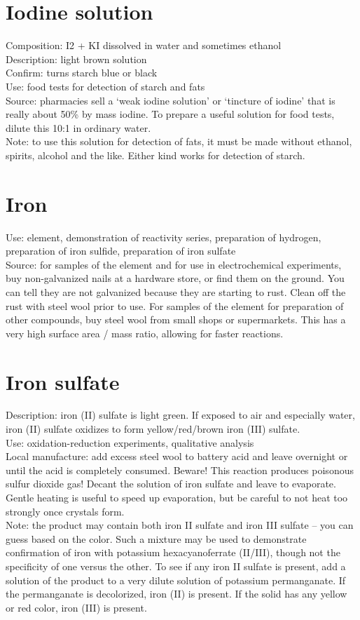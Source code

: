 \section{Iodine solution}
Composition: I2 + KI dissolved in water and sometimes ethanol\\
Description: light brown solution\\
Confirm: turns starch blue or black\\
Use: food tests for detection of starch and fats\\
Source: pharmacies sell a ‘weak iodine solution’ 
or ‘tincture of iodine’ that is really about 50\% by mass iodine. 
To prepare a useful solution for food tests, 
dilute this 10:1 in ordinary water.\\
Note: to use this solution for detection of fats, 
it must be made without ethanol, 
spirits, 
alcohol and the like. 
Either kind works for detection of starch.

\section{Iron}
Use: element, 
demonstration of reactivity series, 
preparation of hydrogen, 
preparation of iron sulfide, 
preparation of iron sulfate\\
Source: for samples of the element 
and for use in electrochemical experiments, 
buy non-galvanized nails at a hardware store, 
or find them on the ground. 
You can tell they are not galvanized because they are starting to rust. 
Clean off the rust with steel wool prior to use. 
For samples of the element for preparation of other compounds, 
buy steel wool from small shops or supermarkets. 
This has a very high surface area / mass ratio, 
allowing for faster reactions.

\section{Iron sulfate}
Description: iron (II) sulfate is light green. 
If exposed to air and especially water, 
iron (II) sulfate oxidizes to form yellow/red/brown iron (III) sulfate.\\
Use: oxidation-reduction experiments, 
qualitative analysis\\
Local manufacture: add excess steel wool to battery acid 
and leave overnight or until the acid is completely consumed. 
Beware! This reaction produces poisonous sulfur dioxide gas! 
Decant the solution of iron sulfate and leave to evaporate. 
Gentle heating is useful to speed up evaporation, 
but be careful to not heat too strongly once crystals form.\\
Note: the product may contain both iron II sulfate and iron III sulfate – 
you can guess based on the color. 
Such a mixture may be used to demonstrate confirmation of iron 
with potassium hexacyanoferrate (II/III), 
though not the specificity of one versus the other. 
To see if any iron II sulfate is present, 
add a solution of the product 
to a very dilute solution of potassium permanganate. 
If the permanganate is decolorized, 
iron (II) is present. 
If the solid has any yellow or red color, 
iron (III) is present.

